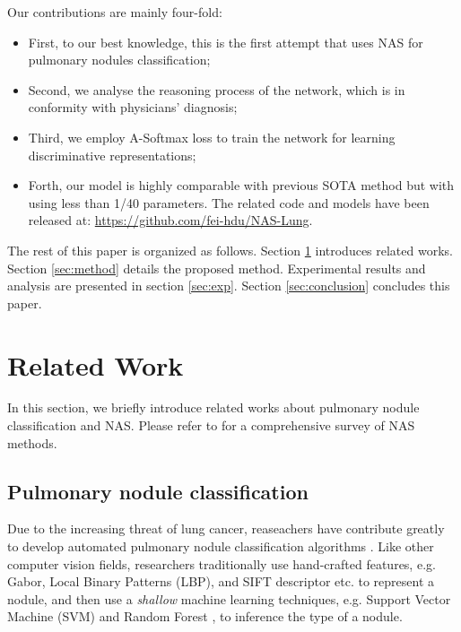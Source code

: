\documentclass[final,5p,times,twocolumn]{elsarticle}
\begin{document}
Our contributions are mainly four-fold:
\begin{itemize}
\item First, to our best knowledge, this is the first attempt that uses NAS for pulmonary nodules classification;

\item Second, we analyse the reasoning process of the network, which is in conformity with physicians' diagnosis;

\item Third, we employ A-Softmax loss to train the network for learning discriminative representations;

\item Forth, our model is highly comparable with previous SOTA method but with using less than 1/40  parameters. The related code and models have been released at: \url{https://github.com/fei-hdu/NAS-Lung}.
\end{itemize}

The rest of this paper is organized as follows. Section \ref{sec:related} introduces related works. Section \ref{sec:method} details the proposed method. Experimental results and analysis are presented in section \ref{sec:exp}. Section \ref{sec:conclusion} concludes this paper.


\section{Related Work}
\label{sec:related}

In this section, we briefly introduce related works about pulmonary nodule classification and NAS. Please refer to \citep{NAS2019JMLR} for a comprehensive survey of NAS methods.

\subsection{Pulmonary nodule classification}
\label{ssec:related-pnc}

Due to the increasing threat of lung cancer, reaseachers have contribute greatly to develop automated pulmonary nodule classification algorithms \cite{fakoor2013using}. Like other computer vision fields, researchers traditionally use hand-crafted features, e.g. Gabor, Local Binary Patterns (LBP), and SIFT descriptor etc. \cite{Fan2014Lung} to represent a nodule, and then use a \textit{shallow} machine learning techniques, e.g. Support Vector Machine (SVM) \cite{Netto2012LungSVM} and Random Forest \cite{Lee2010Random}, to inference the type of a nodule.
\end{document}
